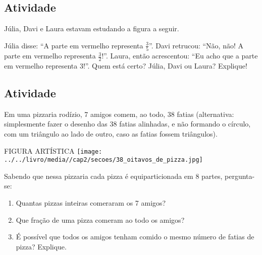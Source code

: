 \documentclass[a4,12pt]{book}
\begin{document}
\subsection{Atividade}

Júlia, Davi e Laura estavam estudando a figura a seguir.
\begin{center}
\end{center}
Júlia disse: ``A parte em vermelho representa $\frac{3}{5}$''. Davi retrucou: ``Não, não! A parte em vermelho representa $\frac{3}{2}$!''. Laura, então acrescentou: ``Eu acho que a parte em vermelho representa $3$!''. Quem está certo? Júlia, Davi ou Laura? Explique!

\subsection{Atividade}

Em uma pizzaria rodízio, 7 amigos comem, ao todo, 38 fatias (alternativa: simplesmente fazer o desenho das 38 fatias alinhadas, e não formando o círculo, com um triângulo ao lado de outro, caso as fatias fossem triângulos).
\begin{imagem*}[breakable]{}{}   FIGURA ARTÍSTICA   
    \texttt{[image: ../../livro/media//cap2/secoes/38\_oitavos\_de\_pizza.jpg]}  
\end{imagem*}

Sabendo que nessa pizzaria cada pizza é equiparticionada em 8 partes, pergunta-se: 
\begin{enumerate} [\quad a)] %
  \item     Quantas pizzas inteiras comeraram os 7 amigos? 
  \item     Que fração de uma pizza comeram  ao todo os amigos? 
  \item     É possível que todos os amigos tenham comido o mesmo número de fatias de pizza? Explique.
\end{enumerate} %
\end{document}
